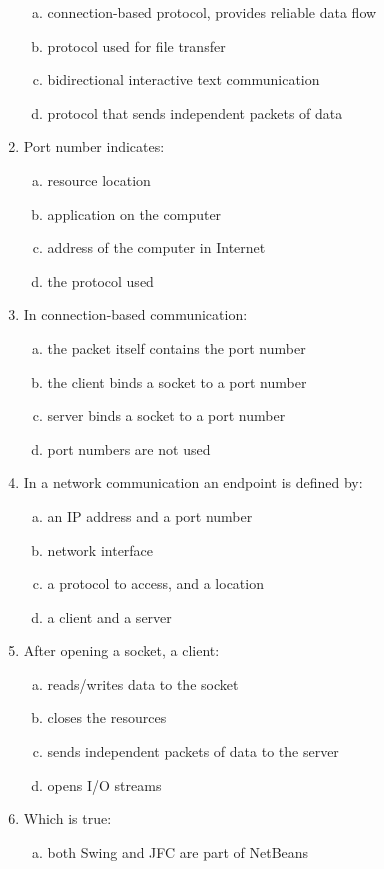 \documentclass[10pt,a4paper,twocolumn]{article}
\begin{document}
\begin{enumerate}
\begin{enumerate}[(a)]
	\item connection-based protocol, provides reliable data flow
	\item protocol used for file transfer
	\item bidirectional interactive text communication
	\item protocol that sends independent packets of data
\end{enumerate}
\item Port number indicates:
\begin{enumerate}[(a)]
	\item resource location
	\item application on the computer
	\item address of the computer in Internet
	\item the protocol used
\end{enumerate}
\item In connection-based communication:
\begin{enumerate}[(a)]
	\item the packet itself contains the port number
	\item the client binds a socket to a port number
	\item server binds a socket to a port number
	\item port numbers are not used
\end{enumerate}
\item In a network communication an endpoint is defined by:
\begin{enumerate}[(a)]
	\item an IP address and a port number
	\item network interface
	\item a protocol to access, and a location
	\item a client and a server
\end{enumerate}
\item After opening a socket, a client:
\begin{enumerate}[(a)]
	\item reads/writes data to the socket
	\item closes the resources
	\item sends independent packets of data to the server
	\item opens I/O streams
\end{enumerate}
\item Which is true:
\begin{enumerate}[(a)]
	\item both Swing and JFC are part of NetBeans

\end{enumerate}
\end{enumerate}
\end{document}
